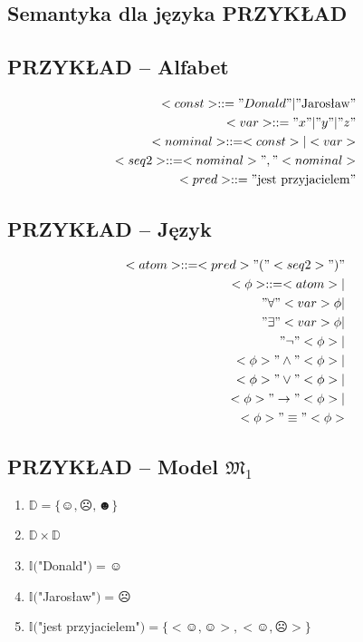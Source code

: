 \documentclass[12pt]{article}
\begin{document}
\subsection{Semantyka dla języka PRZYKŁAD}
%


\subsection{PRZYKŁAD -- Alfabet}
%
\begin{eqnarray}
<const> ::= "Donald" | "\text{Jarosław}" \\ %
<var> ::= "x" | "y" | "z" \\ %
<nominal> ::= <const> | <var> \\ %
<seq2> ::= <nominal>","<nominal> \\ %
<pred> ::= "\text{jest przyjacielem}"
\end{eqnarray}
%

\subsection{PRZYKŁAD -- Język}
%
\begin{eqnarray}
<atom> ::= <pred>"("<seq2>")" \\
%
<\phi> ::= <atom> | \nonumber  \\ 
"\forall"<var> \phi | \nonumber  \\
"\exists"<var> \phi | \nonumber  \\
"\neg" <\phi> | \nonumber  \\
<\phi> "\land" <\phi> | \nonumber \\
<\phi> "\lor" <\phi> | \nonumber  \\
<\phi> "\to" <\phi> | \nonumber  \\
<\phi> "\equiv" <\phi>
\end{eqnarray}
%

\subsection{PRZYKŁAD -- Model $\mathfrak{M}_1$}
%
\begin{enumerate}
    \item $\mathbb{D} = \{\smiley{}, \frownie{}, \blacksmiley{} \}$%
    \item $\mathbb{D} \times \mathbb{D}$%
    \item $\mathbb{I}($"Donald"$)=\smiley{}$%
    \item $\mathbb{I}($"Jarosław"$)=\frownie{}$%
    \item $\mathbb{I}($"jest przyjacielem"$)=\{<\smiley{}, \smiley{}>, <\smiley{}, \frownie{}> \}$
\end{enumerate}
%
\end{document}
